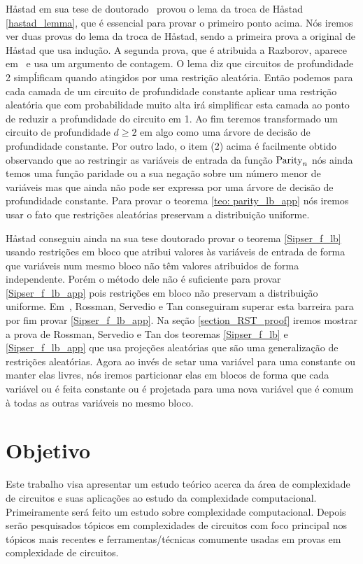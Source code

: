 H{\aa}stad em sua tese de doutorado~\cite{haastad1987computational} provou o lema da troca de H{\aa}stad \ref{hastad_lemma}, que é essencial para provar o primeiro ponto acima. Nós iremos ver duas provas do lema da troca de H{\aa}stad, sendo a primeira prova a original de H{\aa}stad que usa indução. A segunda prova, que é atribuida a Razborov, aparece em~\cite{beame1994switching} e usa um argumento de contagem. O lema diz que circuitos de profundidade 2 simpĺificam quando atingidos por uma restrição aleatória. Então podemos para cada camada de um circuito de profundidade constante aplicar uma restrição aleatória que com probabilidade muito alta irá simplificar esta camada ao ponto de reduzir a profundidade do circuito em 1. Ao fim teremos transformado um circuito de profundidade $d \geq 2$ em algo como uma árvore de decisão de profundidade constante. Por outro lado, o item (2) acima é facilmente obtido observando que ao restringir as variáveis de entrada da função $\text{Parity}_{n}$ nós ainda temos uma função paridade ou a sua negação sobre um número menor de variáveis mas que ainda não pode ser expressa por uma árvore de decisão de profundidade constante. Para provar o teorema \ref{teo: parity_lb_app} nós iremos usar o fato que restrições aleatórias preservam a distribuição uniforme.

H{\aa}stad conseguiu ainda na sua tese doutorado provar o teorema \ref{Sipser_f_lb} usando restrições em bloco que atribui valores às variáveis de entrada de forma que variáveis num mesmo bloco não têm valores atribuidos de forma independente. Porém o método dele não é suficiente para provar \ref{Sipser_f_lb_app} pois restrições em bloco não preservam a distribuição uniforme. Em~\cite{rossman2015average}, Rossman, Servedio e Tan conseguiram superar esta barreira para por fim provar \ref{Sipser_f_lb_app}. Na seção \ref{section_RST_proof} iremos mostrar a prova de Rossman, Servedio e Tan dos teoremas \ref{Sipser_f_lb} e \ref{Sipser_f_lb_app} que usa projeções aleatórias que são uma generalização de restrições aleatórias. Agora ao invés de setar uma variável para uma constante ou manter elas livres, nós iremos particionar elas em blocos de forma que cada variável ou é feita constante ou é projetada para uma nova variável que é comum à todas as outras variáveis no mesmo bloco.

\section{Objetivo}

Este trabalho visa apresentar um estudo teórico acerca da área de complexidade de circuitos e suas aplicações ao estudo da complexidade computacional. Primeiramente será feito um estudo sobre complexidade computacional. Depois serão pesquisados tópicos em complexidades de circuitos com foco principal nos tópicos mais recentes e ferramentas/técnicas comumente usadas em provas em complexidade de circuitos.
